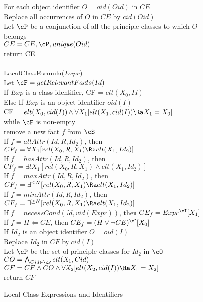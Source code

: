 \begin{figure}[htbp]
{\begin{tabbing}
\> \> For each object identifier $O = oid(Oid)$ in $CE$ \\
\> \> \> Replace all occurrences of $O$ in $CE$ by $cid(Oid)$ \\
\> \> \> Let $\cP$ be a conjunction of all the principle classes to
	which $O$ belongs \\
\> \> \> $CE = CE,\cP,unique(Oid)$  \\
\> \> return CE \\
\\
\>  \underline{LocalClassFormula($ Expr $)}  \\
\> \> Let $\cF = getRelevantFacts(Id)$ \\
\> \> If $ Exp $ is a class identifier, CF = $elt(X_0,Id)$ \\
\> \> Else If $ Exp $ is an object identifier $oid(I)$ \\
\> \> \> CF = $elt(X_0,cid(I)) 
	\wedge \forall X_1 [elt(X_1,cid(I)) \Ra X_1 = X_0]$ \\
\> \> while $\cF$ is non-empty \\
\> \> \> remove a new fact $f$ from $\cS$ \\
\> \> \> If $f = allAttr(Id,R,Id_2)$, then 
	$CF_f = \forall X_1 [rel(X_0,R,X_1) \Ra elt(X_1,Id_2)]$ \\
\> \> \> If $f = hasAttr(Id,R,Id_2)$, then 
	$CF_f = \exists l X_1 [rel(X_0,R,X_1) \wedge elt(X_1,Id_2)]$ \\
\> \> \> If $f = maxAttr(Id,R,Id_2)$, then 
	$CF_f = \exists^{\leq N} [rel(X_0,R,X_1) \Ra elt(X_1,Id_2)]$ \\
\> \> \> If $f = minAttr(Id,R,Id_2)$, then 
	$CF_f = \exists^{\geq N} [rel(X_0,R,X_1) \Ra elt(X_1,Id_2)]$ \\
\> \> \> If $f = necessCond(Id,vid(Expr))$, then $CE_f = Expr^{\cI}[X_1]$ \\
\> \> \> If $f = H \Leftarrow CE$, then $CE_f = (H \vee \neg CE)^{\cI}[X_0]$ \\
\> \> \> If $Id_2$ is an object identifier $O = oid(I)$ \\
\> \> \> \> Replace $Id_2$ in $CF$ by $cid(I)$ \\
\> \> \> \> Let $\cP$ be the set of principle classes for $Id_2$ in $\cO$ \\
\> \> \> \> $CO = \bigwedge_{Cid \in \cP} elt(X_1,Cid) $ \\
\> \> \> \> $CF = CF \wedge CO \wedge 
		\forall X_2 [elt(X_2,cid(I)) \Ra X_1 = X_2] $\\
\> \> return $CF$
\end{tabbing}
}
\caption{Local Class Expressions and Identifiers}
\label{fig:lcelcf}
\longline
\end{figure}

